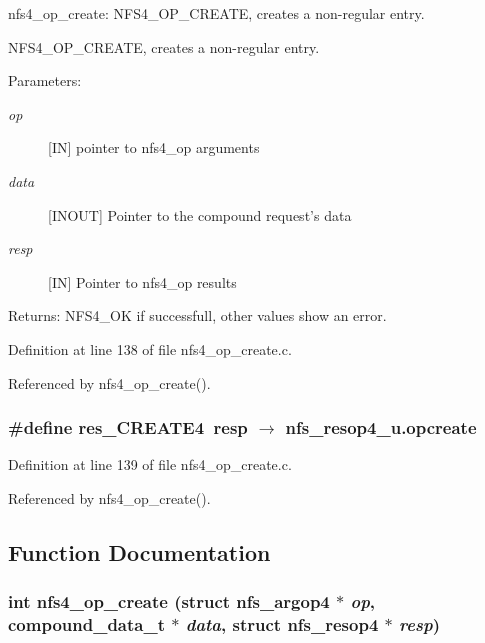 nfs4\_\-op\_\-create: NFS4\_\-OP\_\-CREATE, creates a non-regular entry.

NFS4\_\-OP\_\-CREATE, creates a non-regular entry.

\begin{Desc}
\item[Parameters:]
\begin{description}
\item[{\em op}][IN] pointer to nfs4\_\-op arguments \item[{\em data}][INOUT] Pointer to the compound request's data \item[{\em resp}][IN] Pointer to nfs4\_\-op results\end{description}
\end{Desc}
\begin{Desc}
\item[Returns:]NFS4\_\-OK if successfull, other values show an error. \end{Desc}


Definition at line 138 of file nfs4\_\-op\_\-create.c.

Referenced by nfs4\_\-op\_\-create().
\subsubsection{\setlength{\rightskip}{0pt plus 5cm}\#define res\_\-CREATE4\ resp $\rightarrow$ nfs\_\-resop4\_\-u.opcreate}\label{nfs4__op__create_8c_a1}




Definition at line 139 of file nfs4\_\-op\_\-create.c.

Referenced by nfs4\_\-op\_\-create().

\subsection{Function Documentation}
\subsubsection{\setlength{\rightskip}{0pt plus 5cm}int nfs4\_\-op\_\-create (struct nfs\_\-argop4 $\ast$ {\em op}, compound\_\-data\_\-t $\ast$ {\em data}, struct nfs\_\-resop4 $\ast$ {\em resp})}\label{nfs4__op__create_8c_a2}





